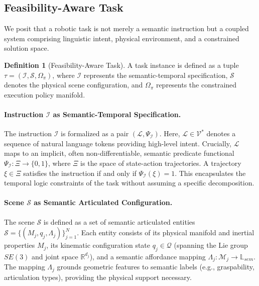 \documentclass{article}
\theoremstyle{plain}
\theoremstyle{definition}
\newtheorem{definition}[theorem]{Definition}
\theoremstyle{remark}
\begin{document}




\subsection{Feasibility-Aware Task}
\label{subsec:task_def}

We posit that a robotic task is not merely a semantic instruction but a coupled system comprising linguistic intent, physical environment, and a constrained solution space.
\begin{definition}[Feasibility-Aware Task]
\label{def:task_tuple}
A task instance is defined as a tuple $\tau = (\mathcal{I}, \mathcal{S}, \Omega_\pi)$, where $\mathcal{I}$ represents the semantic-temporal specification, $\mathcal{S}$ denotes the physical scene configuration, and $\Omega_\pi$ represents the constrained execution policy manifold.
\end{definition}
\paragraph{Instruction $\mathcal{I}$ as Semantic-Temporal Specification.}
The instruction $\mathcal{I}$ is formalized as a pair $(\mathcal{L}, \Psi_\mathcal{I})$. Here, $\mathcal{L} \in \mathcal{V}^*$ denotes a sequence of natural language tokens providing high-level intent. Crucially, $\mathcal{L}$ maps to an implicit, often non-differentiable, semantic predicate functional $\Psi_\mathcal{I}: \Xi \to \{0, 1\}$, where $\Xi$ is the space of state-action trajectories. A trajectory $\xi \in \Xi$ satisfies the instruction if and only if $\Psi_\mathcal{I}(\xi) = 1$. This encapsulates the temporal logic constraints of the task without assuming a specific decomposition.
\paragraph{Scene $\mathcal{S}$ as Semantic Articulated Configuration.}
The scene $\mathcal{S}$ is defined as a set of semantic articulated entities $\mathcal{S} = \{ (M_j, q_j, \Lambda_j) \}_{j=1}^N$. Each entity consists of its physical manifold and inertial properties $M_j$, its kinematic configuration state $q_j \in \mathcal{Q}$ (spanning the Lie group $SE(3)$ and joint space $\mathbb{R}^{d_j}$), and a semantic affordance mapping $\Lambda_j: \mathcal{M}_j \to \mathbb{L}_{sem}$. The mapping $\Lambda_j$ grounds geometric features to semantic labels (e.g., graspability, articulation types), providing the physical support necessary.
\end{document}
